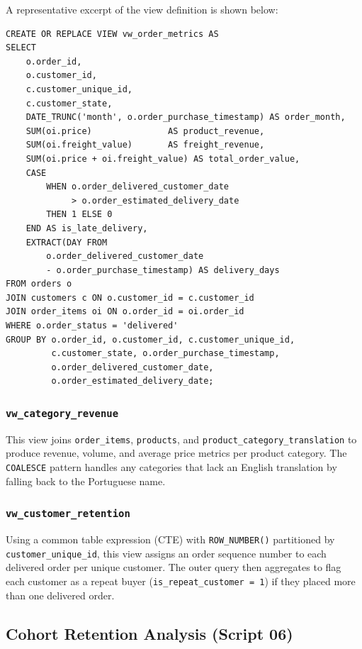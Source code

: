 \documentclass[12pt,a4paper]{article}
\begin{document}
A representative excerpt of the view definition is shown below:

\begin{lstlisting}[caption={Core delivered-order metrics view (excerpt).}, label={lst:vw_order}]
CREATE OR REPLACE VIEW vw_order_metrics AS
SELECT
    o.order_id,
    o.customer_id,
    c.customer_unique_id,
    c.customer_state,
    DATE_TRUNC('month', o.order_purchase_timestamp) AS order_month,
    SUM(oi.price)               AS product_revenue,
    SUM(oi.freight_value)       AS freight_revenue,
    SUM(oi.price + oi.freight_value) AS total_order_value,
    CASE
        WHEN o.order_delivered_customer_date
             > o.order_estimated_delivery_date
        THEN 1 ELSE 0
    END AS is_late_delivery,
    EXTRACT(DAY FROM
        o.order_delivered_customer_date
        - o.order_purchase_timestamp) AS delivery_days
FROM orders o
JOIN customers c ON o.customer_id = c.customer_id
JOIN order_items oi ON o.order_id = oi.order_id
WHERE o.order_status = 'delivered'
GROUP BY o.order_id, o.customer_id, c.customer_unique_id,
         c.customer_state, o.order_purchase_timestamp,
         o.order_delivered_customer_date,
         o.order_estimated_delivery_date;
\end{lstlisting}

\subsubsection{\texttt{vw\_category\_revenue}}

This view joins \texttt{order\_items}, \texttt{products}, and
\texttt{product\_category\_translation} to produce revenue, volume, and average price
metrics per product category. The \texttt{COALESCE} pattern handles any categories that
lack an English translation by falling back to the Portuguese name.

\subsubsection{\texttt{vw\_customer\_retention}}

Using a common table expression (CTE) with \texttt{ROW\_NUMBER()} partitioned by
\texttt{customer\_unique\_id}, this view assigns an order sequence number to each delivered
order per unique customer. The outer query then aggregates to flag each customer as a
repeat buyer (\texttt{is\_repeat\_customer = 1}) if they placed more than one delivered
order.

\subsection{Cohort Retention Analysis (Script 06)}
\end{document}
